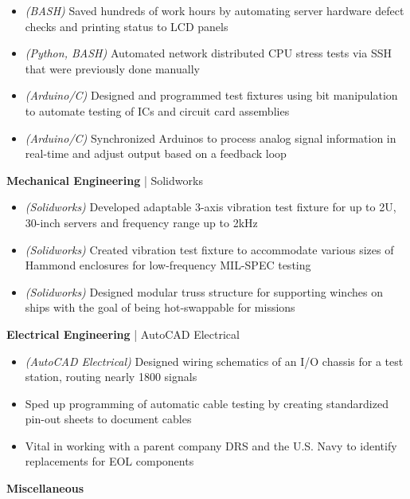 \begin{cventries}
{\begin{cvitems}
{\begin{itemize}[noitemsep,wide=0pt, leftmargin=\dimexpr{} + 2\relax]
					\item[\textbullet]{\textit{(BASH)} Saved hundreds of work hours by automating server hardware defect checks and printing status to LCD panels}
					\item[\textbullet]{\textit{(Python, BASH)} Automated network distributed CPU stress tests via SSH that were previously done manually}
					\item[\textbullet]{\textit{(Arduino/C)} Designed and programmed test fixtures using bit manipulation to automate testing of ICs and circuit card assemblies}
					\item[\textbullet]{\textit{(Arduino/C)} Synchronized Arduinos to process analog signal information in real-time and adjust output based on a feedback loop}
				\end{itemize}}
			\item {\textbf{Mechanical Engineering} | {\color{awesome}Solidworks}
				\begin{itemize}[noitemsep,wide=0pt, leftmargin=\dimexpr{} + 2\relax]
					\item[\textbullet]{\textit{(Solidworks)} Developed adaptable 3-axis vibration test fixture for up to 2U, 30-inch servers and frequency range up to 2kHz}
					\item[\textbullet]{\textit{(Solidworks)} Created vibration test fixture to accommodate various sizes of Hammond enclosures for low-frequency MIL-SPEC testing}
					\item[\textbullet]{\textit{(Solidworks)} Designed modular truss structure for supporting winches on ships with the goal of being hot-swappable for missions}
				\end{itemize}}
			\item {\textbf{Electrical Engineering} | {\color{awesome}AutoCAD Electrical}
				\begin{itemize}[noitemsep,wide=0pt, leftmargin=\dimexpr{} + 2\relax]
					\item[\textbullet]{\textit{(AutoCAD Electrical)} Designed wiring schematics of an I/O chassis for a test station, routing nearly 1800 signals}
					\item[\textbullet]{Sped up programming of automatic cable testing by creating standardized pin-out sheets to document cables}
					\item[\textbullet]{Vital in working with a parent company DRS and the U.S. Navy to identify replacements for EOL components}
				\end{itemize}}
			\item {\textbf{Miscellaneous}
}
\end{cvitems}}
\end{cventries}
